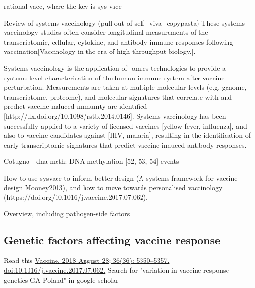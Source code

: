 rational vacc, where the key is sys vacc

Review of systems vaccinology (pull out of self\_viva\_copypasta)
These systems vaccinology studies often consider longitudinal measurements of the transcriptomic, cellular, cytokine, and antibody immune responses following vaccination[Vaccinology in the era of high-throughput biology.].

Systems vaccinology is the application of -omics technologies to provide a systems-level characterisation of the human immune system after vaccine-perturbation.
Measurements are taken at multiple molecular levels (e.g. genome, transcriptome, proteome), and molecular signatures that correlate with and predict vaccine-induced immunity are identified [http://dx.doi.org/10.1098/rstb.2014.0146].
Systems vaccinology has been successfully applied to a variety of licensed vaccines [yellow fever, influenza], and also to vaccine candidates against [HIV, malaria], resulting in the identification of early transcriptomic signatures that predict vaccine-induced antibody responses.


Cotugno
- dna meth: DNA methylation [52, 53, 54] events

How to use sysvacc to inform better design (A systems framework for vaccine design Mooney2013), and how to move towards personalised vaccinology (https://doi.org/10.1016/j.vaccine.2017.07.062).

Overview, including pathogen-side factors

\subsection{Genetic factors affecting vaccine response}


Read this \url{Vaccine. 2018 August 28; 36(36): 5350–5357. doi:10.1016/j.vaccine.2017.07.062.}
Search for "variation in vaccine response genetics GA Poland" in google scholar



